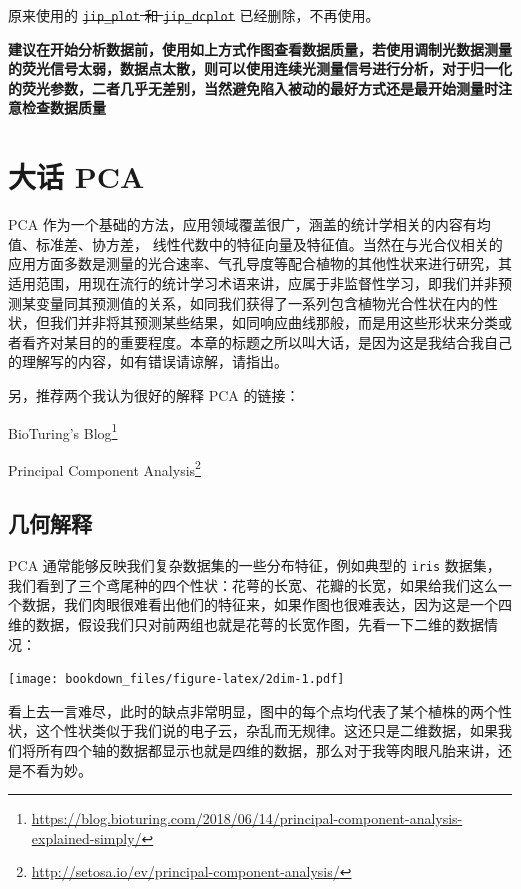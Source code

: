 \documentclass[
]{krantz}
\renewcommand{\href}[2]{#2\footnote{\url{#1}}}
\begin{document}
原来使用的 \sout{\mbox{\texttt{jip\_plot}} 和 \mbox{\texttt{jip\_dcplot}}} 已经删除，不再使用。

\textbf{建议在开始分析数据前，使用如上方式作图查看数据质量，若使用调制光数据测量的荧光信号太弱，数据点太散，则可以使用连续光测量信号进行分析，对于归一化的荧光参数，二者几乎无差别，当然避免陷入被动的最好方式还是最开始测量时注意检查数据质量}

\cleardoublepage

\hypertarget{pca-anylysis}{%
\chapter{大话 PCA}\label{pca-anylysis}}

PCA 作为一个基础的方法，应用领域覆盖很广，涵盖的统计学相关的内容有均值、标准差、协方差， 线性代数中的特征向量及特征值。当然在与光合仪相关的应用方面多数是测量的光合速率、气孔导度等配合植物的其他性状来进行研究，其适用范围，用现在流行的统计学习术语来讲，应属于非监督性学习，即我们并非预测某变量同其预测值的关系，如同我们获得了一系列包含植物光合性状在内的性状，但我们并非将其预测某些结果，如同响应曲线那般，而是用这些形状来分类或者看齐对某目的的重要程度。本章的标题之所以叫大话，是因为这是我结合我自己的理解写的内容，如有错误请谅解，请指出。

另，推荐两个我认为很好的解释 PCA 的链接：

\href{https://blog.bioturing.com/2018/06/14/principal-component-analysis-explained-simply/}{BioTuring's Blog}

\href{http://setosa.io/ev/principal-component-analysis/}{Principal Component Analysis}

\hypertarget{geom-pca}{%
\section{几何解释}\label{geom-pca}}

PCA 通常能够反映我们复杂数据集的一些分布特征，例如典型的 \texttt{iris} 数据集，我们看到了三个鸢尾种的四个性状：花萼的长宽、花瓣的长宽，如果给我们这么一个数据，我们肉眼很难看出他们的特征来，如果作图也很难表达，因为这是一个四维的数据，假设我们只对前两组也就是花萼的长宽作图，先看一下二维的数据情况：

\texttt{[image: bookdown\_files/figure-latex/2dim-1.pdf]}

看上去一言难尽，此时的缺点非常明显，图中的每个点均代表了某个植株的两个性状，这个性状类似于我们说的电子云，杂乱而无规律。这还只是二维数据，如果我们将所有四个轴的数据都显示也就是四维的数据，那么对于我等肉眼凡胎来讲，还是不看为妙。
\end{document}
